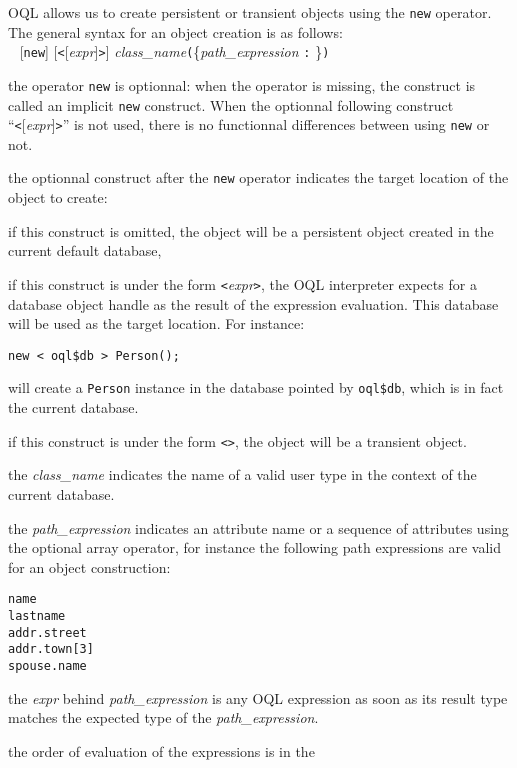 OQL allows us to create persistent or transient objects using the
\texttt{new} operator.
The general syntax for an object creation is as follows:\\
\mbox{ } [\texttt{new}] [\texttt{<}[\emph{expr}]\texttt{>}] 
\emph{class\_name}\texttt{(}\{\emph{path\_expression} \texttt{:} \ex\}\texttt{)}\\
\be
\item the operator \texttt{new} is optionnal: when the operator is missing,
the construct is called an implicit \texttt{new} construct. When
the optionnal following construct ``\texttt{<}[\emph{expr}]\texttt{>}'' is
not used, there is
no functionnal differences between using \texttt{new} or not.
\item the optionnal construct after the \texttt{new} operator indicates
the target location of the object to create:
\be
\item if this construct is omitted, the object will be a 
persistent object created in the current default database,
\item if this construct is under the form \texttt{<}\emph{expr}\texttt{>},
the OQL interpreter expects for a database object handle as the result
of the expression evaluation. This database will be used as the target
location. For instance:
\verbsize
\begin{verbatim}
new < oql$db > Person();
\end{verbatim}
\normalsize
will create a \texttt{Person} instance in the database pointed by
\texttt{oql\$db}, which is in fact the current database.
\item if this construct is under the form \texttt{<}\texttt{>},
the object will be a transient object.
\ee
\item the \emph{class\_name} indicates the name of a valid user
type in the context of the current database.
\item the \emph{path\_expression} indicates an attribute name or
a sequence of attributes using the optional array operator, for instance
the following path expressions are valid for an object construction:
\verbsize
\begin{verbatim}
name
lastname
addr.street
addr.town[3]
spouse.name
\end{verbatim}
\normalsize
\item the \emph{expr} behind \emph{path\_expression} is any OQL expression
as soon as its result type matches the expected type of the \emph{path\_expression}.
\item the order of evaluation of the expressions is in the
